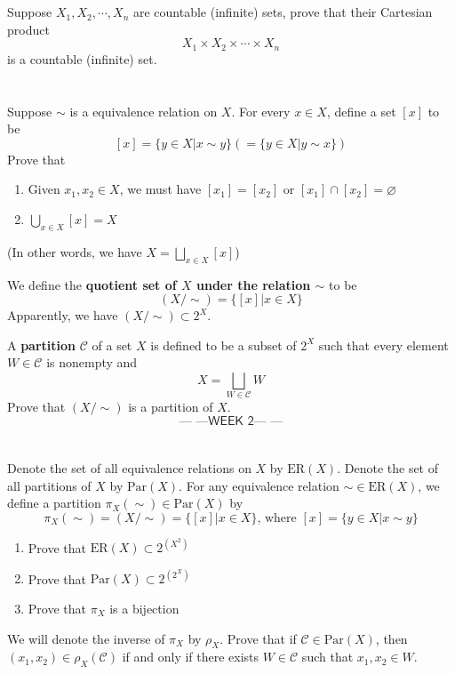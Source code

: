 \documentclass{report}
\newcommand{\week}[1]{$$\textsf{--- ---WEEK #1--- ---}$$}
\begin{document}
\section{}
Suppose $X_1,X_2,\cdots,X_n$ are countable (infinite) sets, prove that their Cartesian product $$X_1\times X_2\times \cdots \times X_n$$is a countable (infinite) set.
\section{}
Suppose $\sim$ is a equivalence relation on $X$. For every $x\in X$, define a set $[x]$ to be
$$\left[x\right]=\{y \in X |x\sim y\} (=\{y \in X|y\sim x\} )$$
Prove that
\begin{enumerate}
\item Given $x_1,x_2 \in X$, we must have $[x_1] = [x_2]$ or $[x_1]\cap[x_2]= \varnothing$
\item $\displaystyle\bigcup_{x\in X} \left[x\right]=X$
\end{enumerate}
(In other words, we have $X = \displaystyle\bigsqcup_{x\in X}[x]$)

We define the \textbf{quotient set of $X$ under the relation $\sim$} to be
\[(X/\sim) = \{[x]|x \in X\}\]
Apparently, we have $(X/\sim) \subset 2^X$.

A \textbf{partition} $\mathcal{C}$ of a set $X$ is defined to be a subset of $2^X$ such that every element $W \in \mathcal{C}$ is nonempty and
\[X = \bigsqcup_{W \in \mathcal{C}} W\]
Prove that $(X/\sim)$ is a partition of $X$.
\newpage\week{2}
\section{}
Denote the set of all equivalence relations on $X$ by $\text{ER}(X)$. Denote the set of all partitions of $X$ by $\text{Par}(X)$. For any equivalence relation $\sim \in \text{ER}(X)$, we define a partition $\pi_X(\sim) \in \text{Par}(X)$ by
\[\pi_X(\sim)=(X/\sim)=\{[x]|x \in X\}\text{, where }[x]=\{y \in X| x\sim y\}\]
\begin{enumerate}
\item Prove that $\text{ER}(X)\subset 2^{(X^2)}$
\item Prove that $\text{Par}(X) \subset 2^{(2^X)}$
\item Prove that $\pi_X$ is a bijection
\end{enumerate}
We will denote the inverse of $\pi_X$ by $\rho_X$. Prove that if $\mathcal{C}\in\text{Par}(X)$, then $(x_1,x_2)\in \rho_X(\mathcal{C})$ if and only if there exists $W \in \mathcal{C}$ such that $x_1,x_2 \in W$.
\end{document}

